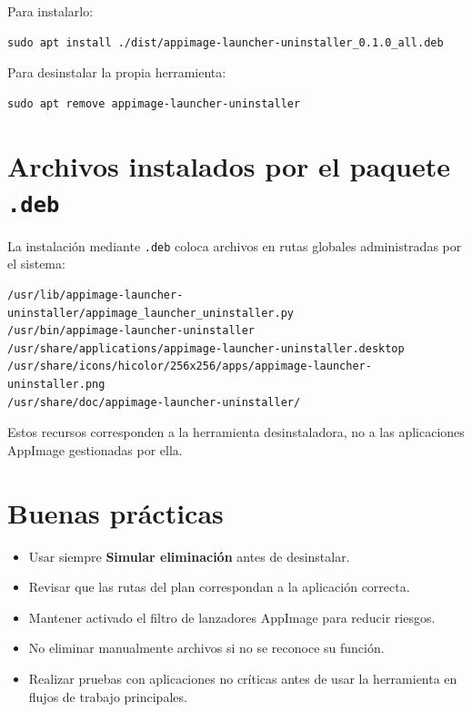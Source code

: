 \documentclass[11pt,a4paper]{article}
\begin{document}
Para instalarlo:

\begin{lstlisting}[style=bashstyle]
sudo apt install ./dist/appimage-launcher-uninstaller_0.1.0_all.deb
\end{lstlisting}

Para desinstalar la propia herramienta:

\begin{lstlisting}[style=bashstyle]
sudo apt remove appimage-launcher-uninstaller
\end{lstlisting}

\section{Archivos instalados por el paquete \texttt{.deb}}

La instalación mediante \texttt{.deb} coloca archivos en rutas globales administradas por el sistema:

\begin{lstlisting}[style=textstyle]
/usr/lib/appimage-launcher-uninstaller/appimage_launcher_uninstaller.py
/usr/bin/appimage-launcher-uninstaller
/usr/share/applications/appimage-launcher-uninstaller.desktop
/usr/share/icons/hicolor/256x256/apps/appimage-launcher-uninstaller.png
/usr/share/doc/appimage-launcher-uninstaller/
\end{lstlisting}

Estos recursos corresponden a la herramienta desinstaladora, no a las aplicaciones AppImage gestionadas por ella.

\section{Buenas prácticas}

\begin{itemize}[leftmargin=1.2cm]
    \item Usar siempre \textbf{Simular eliminación} antes de desinstalar.
    \item Revisar que las rutas del plan correspondan a la aplicación correcta.
    \item Mantener activado el filtro de lanzadores AppImage para reducir riesgos.
    \item No eliminar manualmente archivos si no se reconoce su función.
    \item Realizar pruebas con aplicaciones no críticas antes de usar la herramienta en flujos de trabajo principales.
\end{itemize}
\end{document}
